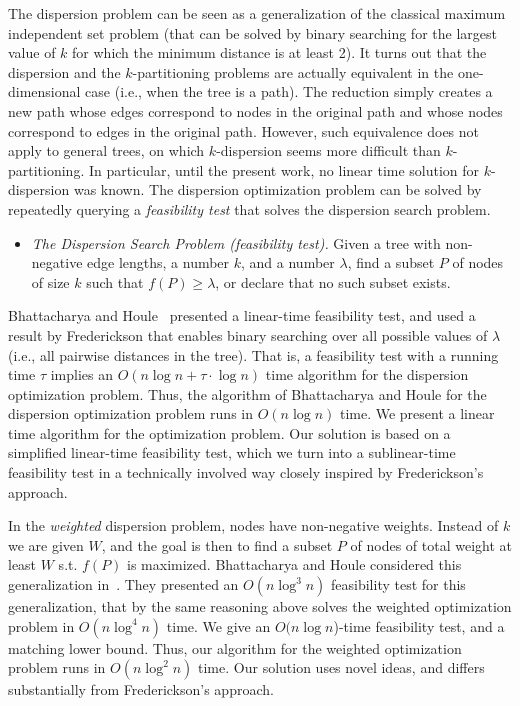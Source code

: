 \documentclass[a4paper,UKenglish]{lipics-v2016}
\theoremstyle{plain}
\begin{document}
\noindent The dispersion problem can be seen as a generalization of the classical maximum independent set problem (that can be solved by binary searching for the largest value of $k$ for which the minimum distance is at least 2).  
%
It turns out that the dispersion and the $k$-partitioning problems are actually equivalent in the one-dimensional case (i.e., when the tree is a path). The reduction simply creates a new path whose edges correspond to nodes in the original path and whose nodes correspond to edges in the original path. However, such equivalence does not apply to general trees, on which $k$-dispersion seems more difficult than $k$-partitioning. In particular, until the present work, no linear time solution for $k$-dispersion was known. 
The dispersion optimization problem can be solved by repeatedly querying a {\em feasibility test} that solves the dispersion search problem. 

\begin{itemize}
\item  {\em The Dispersion Search Problem (feasibility test).}  Given a tree with non-negative edge lengths, a number $k$, and a number $\lambda$, find a subset $P$ of nodes of size $k$ such that  $f(P)\geq\lambda$, or declare that no such subset exists. 
\end{itemize}

\noindent Bhattacharya and Houle~\cite{Bhattacharya1991} presented a linear-time feasibility test, and used a result by Frederickson \cite{Frederickson1983} that enables binary searching over all possible values of $\lambda$ (i.e., all pairwise distances in the tree). That is, a feasibility test with a running time $\tau$ implies an $O(n \log n + \tau \cdot \log n)$ time algorithm for the dispersion optimization problem. Thus, the algorithm of Bhattacharya and Houle for the dispersion optimization problem runs in $O(n\log n)$ time. We present a linear time algorithm for the optimization problem. Our solution is based on a simplified linear-time feasibility test, which we turn into a sublinear-time feasibility test in a technically involved way closely inspired by Frederickson's approach.

In the {\em weighted} dispersion problem, nodes have non-negative weights. Instead of $k$ we are given $W$, and the goal is then to find a subset
$P$ of nodes of total weight at least $W$ s.t. $f(P)$ is maximized. Bhattacharya and Houle considered this generalization in~\cite{Bhattacharya1999}. They presented an $O(n \log^3 n)$ feasibility test for this generalization, that by the same reasoning above solves the weighted optimization problem in $O(n \log^4 n)$ time. We give an $O(n \log n$)-time feasibility test, and a matching lower bound.  Thus, our algorithm for the weighted optimization problem runs in $O(n \log^2 n)$ time. Our solution uses novel ideas, and differs substantially from Frederickson's approach.
\end{document}
